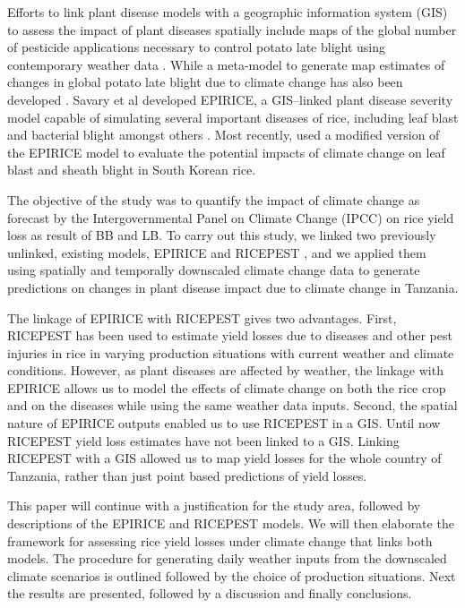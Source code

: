     Efforts to link plant disease models with a geographic information system (GIS) to assess the impact of plant diseases spatially include maps of the global number of pesticide applications necessary to control potato late blight using contemporary weather data \citep{Hijmans2000}. While a meta-model to generate map estimates of changes in global potato late blight due to climate change has also been developed \citep{Sparks2014}. Savary et al developed EPIRICE, a GIS--linked plant disease severity model capable of simulating several important diseases of rice, including leaf blast and bacterial blight amongst others \citep{Savary2012}. Most recently, \citep{Kim2015} used a modified version of the EPIRICE model to evaluate the potential impacts of climate change on leaf blast and sheath blight in South Korean rice.
    
    The objective of the study was to quantify the impact of climate change as forecast by the Intergovernmental Panel on Climate Change (IPCC) on rice yield loss as result of BB and LB. To carry out this study, we linked two previously unlinked, existing models, EPIRICE and RICEPEST \citep{Willocquet2000,Willocquet2002}, and we applied them using spatially and temporally downscaled climate change data to generate predictions on changes in plant disease impact due to climate change in Tanzania.
    
    The linkage of EPIRICE with RICEPEST gives two advantages. First, RICEPEST has been used to estimate yield losses due to diseases and other pest injuries in rice in varying production situations with current weather and climate conditions. However, as plant diseases are affected by weather, the linkage with EPIRICE allows us to model the effects of climate change on both the rice crop and on the diseases while using the same weather data inputs. Second, the spatial nature of EPIRICE outputs enabled us to use RICEPEST in a GIS. Until now RICEPEST yield loss estimates have not been linked to a GIS. Linking RICEPEST with a GIS allowed us to map yield losses for the whole country of Tanzania, rather than just point based predictions of yield losses.
    
    This paper will continue with a justification for the study area, followed by descriptions of the EPIRICE and RICEPEST models. We will then elaborate the framework for assessing rice yield losses under climate change that links both models. The procedure for generating daily weather inputs from the downscaled climate scenarios is outlined followed by the choice of production situations. Next the results are presented, followed by a discussion and finally conclusions.
    

